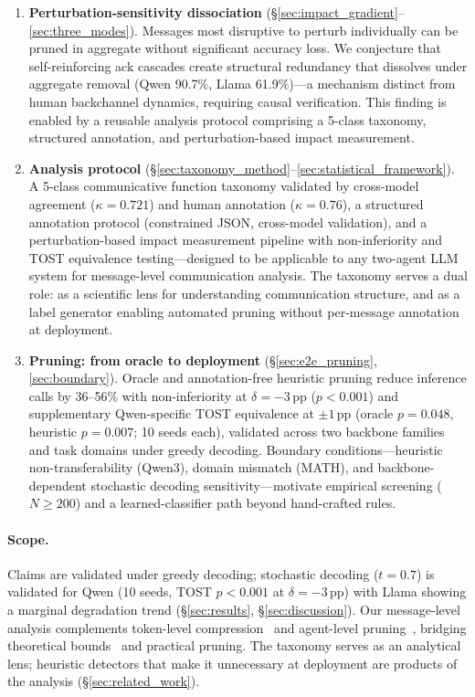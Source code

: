\begin{enumerate}[nosep, leftmargin=*]
    \item \textbf{Perturbation-sensitivity dissociation} (\S\ref{sec:impact_gradient}--\ref{sec:three_modes}). Messages most disruptive to perturb individually can be pruned in aggregate without significant accuracy loss. We conjecture that self-reinforcing ack cascades create structural redundancy that dissolves under aggregate removal (Qwen 90.7\%, Llama 61.9\%)---a mechanism distinct from human backchannel dynamics, requiring causal verification. This finding is enabled by a reusable analysis protocol comprising a 5-class taxonomy, structured annotation, and perturbation-based impact measurement.

    \item \textbf{Analysis protocol} (\S\ref{sec:taxonomy_method}--\ref{sec:statistical_framework}). A 5-class communicative function taxonomy validated by cross-model agreement ($\kappa{=}0.721$) and human annotation ($\kappa{=}0.76$), a structured annotation protocol (constrained JSON, cross-model validation), and a perturbation-based impact measurement pipeline with non-inferiority and TOST equivalence testing---designed to be applicable to any two-agent LLM system for message-level communication analysis. The taxonomy serves a dual role: as a scientific lens for understanding communication structure, and as a label generator enabling automated pruning without per-message annotation at deployment.

    \item \textbf{Pruning: from oracle to deployment} (\S\ref{sec:e2e_pruning}, \ref{sec:boundary}). Oracle and annotation-free heuristic pruning reduce inference calls by 36--56\% with non-inferiority at $\delta = -3$\,pp ($p < 0.001$) and supplementary Qwen-specific TOST equivalence at $\pm 1$\,pp (oracle $p = 0.048$, heuristic $p = 0.007$; 10 seeds each), validated across two backbone families and \numValidatedDomains{} task domains under greedy decoding. Boundary conditions---heuristic non-transferability (Qwen3), domain mismatch (MATH), and backbone-dependent stochastic decoding sensitivity---motivate empirical screening ($N \geq 200$) and a learned-classifier path beyond hand-crafted rules.
\end{enumerate}

\paragraph{Scope.} Claims are validated under greedy decoding; stochastic decoding ($t{=}0.7$) is validated for Qwen (10 seeds, TOST $p < 0.001$ at $\delta = -3$\,pp) with Llama showing a marginal degradation trend (\S\ref{sec:results}, \S\ref{sec:discussion}). Our message-level analysis complements token-level compression~\cite{jiang_llmlingua_2023} and agent-level pruning~\cite{wang_agentdropout_2025}, bridging theoretical bounds~\cite{rizvi_martel_communication_2026} and practical pruning. The taxonomy serves as an analytical lens; heuristic detectors that make it unnecessary at deployment are products of the analysis (\S\ref{sec:related_work}).
